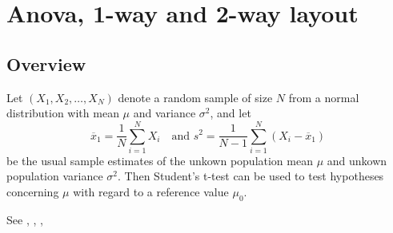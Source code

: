 %
%
%
%
%
%
%
%
%
%




\newpage
\section{Anova, 1-way and 2-way layout}



\subsection{Overview}
\label{Anova1wayOverview}

Let $(X_1, X_2, \ldots, X_N)$ denote a random sample of size $N$ from a normal distribution with mean $\mu$ and variance $\sigma^2$, and let
\begin{equation}
	\overline{x}_1 = \frac{1}{N} \sum_{i=1}^N X_i \quad \text{and } s^2 = \frac{1}{N-1} \sum_{i=1}^N (X_i - \overline{x}_1)
\end{equation}
be the usual sample estimates of the unkown population mean $\mu$ and unkown population variance $\sigma^2$. Then Student's t-test can be used to test hypotheses concerning $\mu$ with regard to a reference value $\mu_0$.

See \cite{Rasch_2011}, \cite{kirk_experimental_1982}, \cite{kirk_experimental_1995}, \cite{kirk_experimental_2013}



